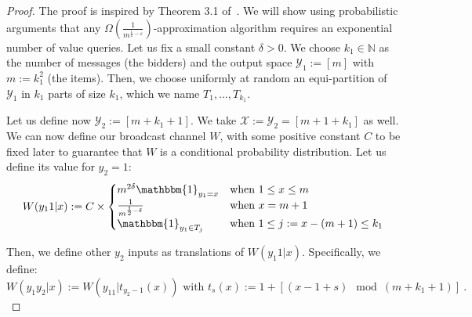 \begin{proof}
  The proof is inspired by Theorem 3.1 of~\cite{MSV08}. We will show using probabilistic arguments that any $\Omega\left(\frac{1}{m^{\frac{1}{2}-\varepsilon}}\right)$-approximation algorithm requires an exponential number of value queries.
  Let us fix a small constant $\delta > 0$. We choose $k_1 \in \mathbb{N}$ as the number of messages (the bidders) and the output space $\mathcal{Y}_1 := [m]$ with $m := k_1^2$ (the items). Then, we choose uniformly at random an equi-partition of $\mathcal{Y}_1$ in $k_1$ parts of size $k_1$, which we name $T_1, \ldots, T_{k_1}$.

  Let us define now $\mathcal{Y}_2 := [m+k_1+1]$. We take $\mathcal{X} := \mathcal{Y}_2 = [m+1+k_1]$ as well. We can now define our broadcast channel $W$, with some positive constant $C$ to be fixed later to guarantee that $W$ is a conditional probability distribution. Let us define its value for $y_2=1$:
  \[ W(y_1 1|x) := C\times\begin{cases}
    m^{2\delta}\mathbbm{1}_{y_1=x} & \text{when } 1 \leq x \leq m\\
  \frac{1}{m^{\frac{1}{2}-\delta}} & \text{when } x = m+1\\
  \mathbbm{1}_{y_1 \in T_j} & \text{when } 1 \leq j := x-(m+1) \leq k_1\\
  \end{cases}
  \]

  Then, we define other $y_2$ inputs as translations of $W(y_1 1|x)$. Specifically, we define:
  \[ W(y_1y_2|x) := W(y_11|t_{y_2-1}(x)) \text{ with } t_s(x) := 1 + [(x-1+s) \mod (m+k_1+1)] \ .\] 


\end{proof}
